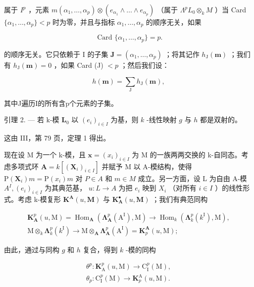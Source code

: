 属于 \(I^{p}\) ，元素 \(m(\alpha_{1},\ldots,\alpha_{p})\otimes(e_{\alpha_{1}}\wedge\ldots\wedge e_{\alpha_{p}})\) （属于 \(\Lambda^{p}L_{0}\otimes_{k}M\) ）当 Card \(\{\alpha_{1},\ldots,\alpha_{p}\}<p\) 时为零，并且与指标 \(\alpha_{1},\ldots,\alpha_{p}\) 的顺序无关，如果

\[
\text { Card } \{\alpha_ {1}, \dots , \alpha_ {p} \} = p.
\]

的顺序无关。它只依赖于 I 的子集 \(\mathbf{J} = (\alpha_{1},\ldots ,\alpha_{p})\) ；将其记作 \(h_\mathrm{J}(\pmb {m})\) ；我们有 \(h_\mathrm{J}(\pmb {m}) = 0\) ，如果 Card (J) \(< p\) ；然后我们设：

\[
h (\boldsymbol {m}) = \sum_ {\mathrm{J}} h _ {\mathrm{J}} (\boldsymbol {m}),
\]

其中J遍历I的所有含p个元素的子集。

引理 2. --- 若 k-模 \(\mathbf{L}_{0}\) 以 \((e_{i})_{i\in I}\) 为基，则 \(k\) -线性映射 \(g\) 与 \(h\) 都是双射的。

这由 III，第 79 页，定理 1 得出。

现在设 M 为一个 k-模，且 \(\boldsymbol{x} = (x_{i})_{i \in I}\) 为 M 的一族两两交换的 k-自同态。考虑多项式环 \(\mathbf{A} = k[(\mathbf{X}_{i})_{i \in I}]\) 并赋予 M 以 A-模结构，使得 \(\mathrm{P}(\mathbf{X}_{i}) m = \mathrm{P}(x_{i}) m\) 对 \(P \in A\) 和 \(m \in M\) 成立。另一方面，设 L 为自由 A-模 \(A^{I}, (e_{i})_{i \in I}\) 为其典范基， \(u : L \to A\) 为把 \(e_{i}\) 映到 \(X_{i}\) （对所有 \(i \in I\) ）的线性形式。考虑 k-模复形 \(\mathbf{K}^{\mathbf{A}}(u, \mathbf{M})\) 与 \(\mathbf{K}_{\mathbf{A}}^{\bullet}(u, \mathbf{M})\) ；我们有典范同构

\[
\begin{array}{c} \mathbf {K} _ {\mathbf {A}} ^ {p} (u, \mathrm{M}) = \operatorname{Hom} _ {\mathbf {A}} \left(\boldsymbol {\Lambda} _ {\mathbf {A}} ^ {p} (\mathrm{A} ^ {\mathrm{I}}), \mathrm{M}\right) \to \operatorname{Hom} _ {k} \left(\boldsymbol {\Lambda} _ {k} ^ {p} (k ^ {\mathrm{I}}), \mathrm{M}\right), \\ \mathrm{M} \otimes_ {k} \boldsymbol {\Lambda} _ {k} ^ {p} (k ^ {\mathrm{I}}) \to \mathrm{M} \otimes_ {\mathbf {A}} \boldsymbol {\Lambda} _ {\mathbf {A}} ^ {p} (\mathrm{A} ^ {\mathrm{I}}) = \mathbf {K} _ {p} ^ {\mathbf {A}} (u, \mathrm{M}); \end{array}
\]

由此，通过与同构 \(g\) 和 \(h\) 复合，得到 \(k\) -模的同构

\[
\begin{array}{l} \theta^ {p}: \mathbf {K} _ {\mathrm{A}} ^ {p} (u, \mathrm{M}) \to \mathrm{C} _ {\mathrm{I}} ^ {p} (\mathrm{M}), \\ \theta_ {p}: \mathrm{C} _ {\mathrm{I}} ^ {p} (\mathrm{M}) \to \mathbf {K} _ {p} ^ {\mathrm{A}} (u, \mathrm{M}). \end{array}
\]

